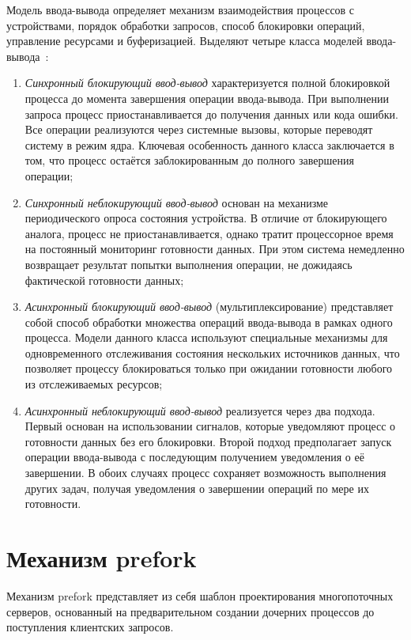 Модель ввода-вывода определяет механизм взаимодействия процессов с устройствами, порядок обработки запросов, способ блокировки операций, управление ресурсами и буферизацией. Выделяют четыре класса моделей ввода-вывода~\cite{ryzanova}:
\begin{enumerate}
	\item \textit{Синхронный блокирующий ввод-вывод} характеризуется полной блокировкой процесса до момента завершения операции ввода-вывода. При выполнении запроса процесс приостанавливается до получения данных или кода ошибки. Все операции реализуются через системные вызовы, которые переводят систему в режим ядра. Ключевая особенность данного класса заключается в том, что процесс остаётся заблокированным до полного завершения операции;
	\item \textit{Синхронный неблокирующий ввод-вывод} основан на механизме периодического опроса состояния устройства. В отличие от блокирующего аналога, процесс не приостанавливается, однако тратит процессорное время на постоянный мониторинг готовности данных. При этом система немедленно возвращает результат попытки выполнения операции, не дожидаясь фактической готовности данных;
	\item \textit{Асинхронный блокирующий ввод-вывод} (мультиплексирование) представляет собой способ обработки множества операций ввода-вывода в рамках одного процесса. Модели данного класса используют специальные механизмы для одновременного отслеживания состояния нескольких источников данных, что позволяет процессу блокироваться только при ожидании готовности любого из отслеживаемых ресурсов;
	\item \textit{Асинхронный неблокирующий ввод-вывод} реализуется через два подхода. Первый основан на использовании сигналов, которые уведомляют процесс о готовности данных без его блокировки. Второй подход предполагает запуск операции ввода-вывода с последующим получением уведомления о её завершении. В обоих случаях процесс сохраняет возможность выполнения других задач, получая уведомления о завершении операций по мере их готовности.
\end{enumerate}

\section{Механизм prefork}

Механизм prefork представляет из себя шаблон проектирования многопоточных серверов, основанный на предварительном создании дочерних процессов до поступления клиентских запросов. 

